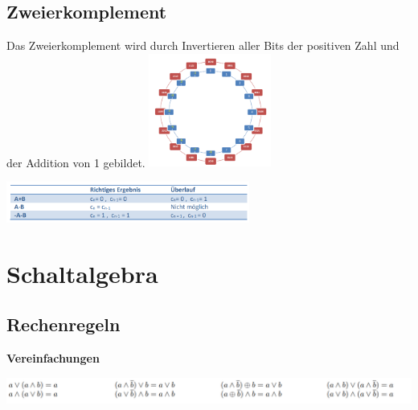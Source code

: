\documentclass[10pt]{article}
\begin{document}
\begin{multicols}{3}
\subsection{Zweierkomplement}
Das Zweierkomplement wird durch Invertieren aller Bits der
positiven Zahl und der Addition von 1 gebildet.
\includegraphics[width=0.3\textwidth]{Zweirkomplement.PNG}
\end{multicols}
\begin{center}
    \includegraphics[width=0.6\textwidth]{Bereichsuberschreitung.PNG}
\end{center}
\section{Schaltalgebra}
\subsection{Rechenregeln}
    \textbf{Vereinfachungen}
    \begin{center}
         \includegraphics[width=\textwidth]{Vereinfachung.PNG}
    \end{center}
\end{document}
